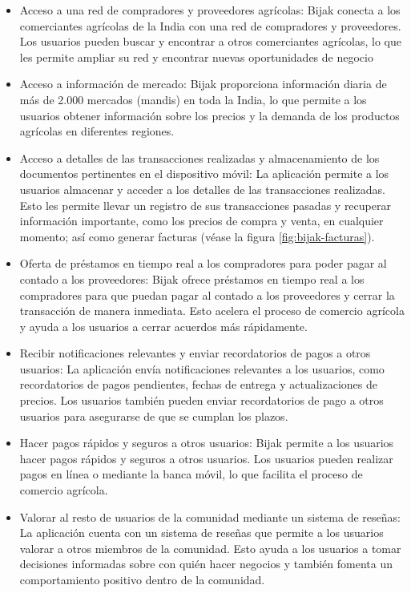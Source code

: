 \begin{itemize}

	\item Acceso a una red de compradores y proveedores agrícolas: Bijak conecta a los comerciantes agrícolas de la India con una red de compradores y proveedores. Los usuarios pueden buscar y encontrar a otros comerciantes agrícolas, lo que les permite ampliar su red y encontrar nuevas oportunidades de negocio

	\item Acceso a información de mercado: Bijak proporciona información diaria de más de 2.000 mercados (mandis) en toda la India, lo que permite a los usuarios obtener información sobre los precios y la demanda de los productos agrícolas en diferentes regiones.

	\item Acceso a detalles de las transacciones realizadas y almacenamiento de los documentos pertinentes en el dispositivo móvil: La aplicación permite a los usuarios almacenar y acceder a los detalles de las transacciones realizadas. Esto les permite llevar un registro de sus transacciones pasadas y recuperar información importante, como los precios de compra y venta, en cualquier momento; así como generar facturas (véase la figura \ref{fig:bijak-facturas}).

	\item Oferta de préstamos en tiempo real a los compradores para poder pagar al contado a los proveedores: Bijak ofrece préstamos en tiempo real a los compradores para que puedan pagar al contado a los proveedores y cerrar la transacción de manera inmediata. Esto acelera el proceso de comercio agrícola y ayuda a los usuarios a cerrar acuerdos más rápidamente.

	\item Recibir notificaciones relevantes y enviar recordatorios de pagos a otros usuarios: La aplicación envía notificaciones relevantes a los usuarios, como recordatorios de pagos pendientes, fechas de entrega y actualizaciones de precios. Los usuarios también pueden enviar recordatorios de pago a otros usuarios para asegurarse de que se cumplan los plazos.

	\item Hacer pagos rápidos y seguros a otros usuarios: Bijak permite a los usuarios hacer pagos rápidos y seguros a otros usuarios. Los usuarios pueden realizar pagos en línea o mediante la banca móvil, lo que facilita el proceso de comercio agrícola.

	\item Valorar al resto de usuarios de la comunidad mediante un sistema de reseñas: La aplicación cuenta con un sistema de reseñas que permite a los usuarios valorar a otros miembros de la comunidad. Esto ayuda a los usuarios a tomar decisiones informadas sobre con quién hacer negocios y también fomenta un comportamiento positivo dentro de la comunidad.

\end{itemize}

